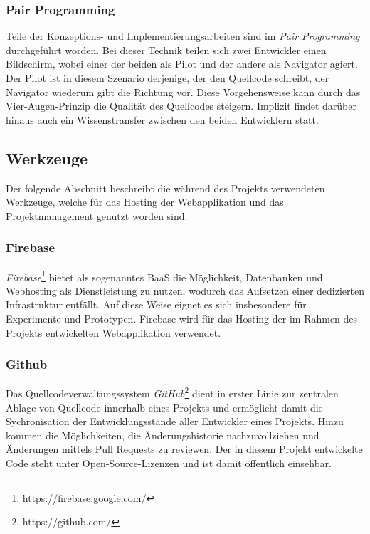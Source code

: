 \subsubsection{Pair Programming}
\label{pair_programming}

Teile der Konzeptions- und Implementierungsarbeiten sind im \emph{Pair Programming} durchgeführt worden. Bei dieser Technik teilen sich zwei Entwickler einen Bildschirm, wobei einer der beiden als Pilot und der andere als Navigator agiert. Der Pilot ist in diesem Szenario derjenige, der den Quellcode schreibt, der Navigator wiederum gibt die Richtung vor. Diese Vorgehensweise kann durch das Vier-Augen-Prinzip die Qualität des Quellcodes steigern. Implizit findet darüber hinaus auch ein Wissenstransfer zwischen den beiden Entwicklern statt.

\subsection{Werkzeuge}
\label{werkzeuge_und_projektstruktur}

Der folgende Abschnitt beschreibt die während des Projekts verwendeten Werkzeuge, welche für das Hosting der Webapplikation und das Projektmanagement genutzt worden sind.

\subsubsection{Firebase}
\label{firebase}

\emph{Firebase}\footnote{https://firebase.google.com/} bietet als sogenanntes \ac{BaaS} die Möglichkeit, Datenbanken und Webhosting als Dienstleistung zu nutzen, wodurch das Aufsetzen einer dedizierten Infrastruktur entfällt. Auf diese Weise eignet es sich insbesondere für Experimente und Prototypen. Firebase wird für das Hosting der im Rahmen des Projekts entwickelten Webapplikation verwendet.

\subsubsection{Github}
\label{github}

Das Quellcodeverwaltungssystem \emph{GitHub}\footnote{https://github.com/} dient in erster Linie zur zentralen Ablage von Quellcode innerhalb eines Projekts und ermöglicht damit die Sychronisation der Entwicklungsstände aller Entwickler eines Projekts. Hinzu kommen die Möglichkeiten, die Änderungshistorie nachzuvollziehen und Änderungen mittels Pull Requests zu reviewen. Der in diesem Projekt entwickelte Code steht unter Open-Source-Lizenzen und ist damit öffentlich einsehbar.

